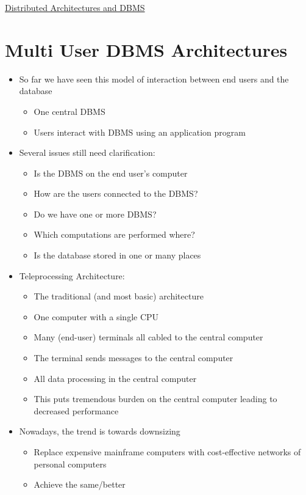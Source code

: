 \documentclass{article}[18pt]
\begin{document}
\begin{center}
\underline{\huge Distributed Architectures and DBMS}
\end{center}
\section{Multi User DBMS Architectures}
\begin{itemize}
	\item So far we have seen this model of interaction between end users and the database
	\begin{itemize}
		\item One central DBMS
		\item Users interact with DBMS using an application program
	\end{itemize}
	\item Several issues still need clarification:
	\begin{itemize}
		\item Is the DBMS on the end user's computer
		\item How are the users connected to the DBMS?
		\item Do we have one or more DBMS?
		\item Which computations are performed where?
		\item Is the database stored in one or many places
	\end{itemize}
	\item Teleprocessing Architecture:
	\begin{itemize}
		\item The traditional (and most basic) architecture
		\item One computer with a single CPU
		\item Many (end-user) terminals all cabled to the central computer
		\item The terminal sends messages to the central computer
		\item All data processing in the central computer
		\item This puts tremendous burden on the central computer leading to decreased performance
	\end{itemize}
	\item Nowadays, the trend is towards downsizing
	\begin{itemize}
		\item Replace expensive mainframe computers with cost-effective networks of personal computers
		\item Achieve the same/better 
	\end{itemize}
\end{itemize}
\end{document}
